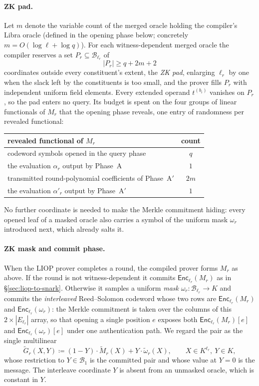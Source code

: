 \documentclass{article}
\theoremstyle{definition}
\newcommand*{\mle}{\widetilde}
\newcommand{\BB}{\mathcal{B}}
\begin{document}
\paragraph{ZK pad.}
Let $m$ denote the variable count of the merged oracle holding the compiler's Libra oracle (defined in the opening phase below; concretely $m = O(\log \boldsymbol{\ell} + \log q)$). For each witness-dependent merged oracle the compiler reserves a set $P_r \subseteq \BB_{\ell_r}$ of
\[
  |P_r| \ge q + 2m + 2
\]
coordinates outside every constituent's extent, the \emph{ZK pad}, enlarging $\ell_r$ by one when the slack left by the constituents is too small, and the prover fills $P_r$ with independent uniform field elements. Every extended operand $t^{(b_i)}$ vanishes on $P_r$, so the pad enters no query. Its budget is spent on the four groups of linear functionals of $M_r$ that the opening phase reveals, one entry of randomness per revealed functional:
\begin{center}
\begin{tabular}{lc}
\hline
revealed functional of $M_r$ & count \\
\hline
codeword symbols opened in the query phase & $q$ \\
the evaluation $\alpha_r$ output by Phase~A & $1$ \\
transmitted round-polynomial coefficients of Phase~A$'$ & $2m$ \\
the evaluation $\alpha'_r$ output by Phase~A$'$ & $1$ \\
\hline
\end{tabular}
\end{center}
No further coordinate is needed to make the Merkle commitment hiding: every opened leaf of a masked oracle also carries a symbol of the uniform mask $\omega_r$ introduced next, which already salts it.

\paragraph{ZK mask and commit phase.}
When the LIOP prover completes a round, the compiled prover forms $M_r$ as above. If the round is not witness-dependent it commits $\textsf{Enc}_{\ell_r}(M_r)$ as in \S\ref{sec:liop-to-snark}. Otherwise it samples a uniform \emph{mask} $\omega_r \colon \BB_{\ell_r} \to K$ and commits the \emph{interleaved} Reed--Solomon codeword whose two rows are $\textsf{Enc}_{\ell_r}(M_r)$ and $\textsf{Enc}_{\ell_r}(\omega_r)$: the Merkle commitment is taken over the columns of this $2 \times |E_{\ell_r}|$ array, so that opening a single position $e$ exposes both $\textsf{Enc}_{\ell_r}(M_r)[e]$ and $\textsf{Enc}_{\ell_r}(\omega_r)[e]$ under one authentication path. We regard the pair as the single multilinear
\[
  \mle{G}_r(X, Y) \coloneqq (1 - Y) \cdot \mle{M}_r(X) + Y \cdot \mle{\omega}_r(X), \qquad X \in K^{\ell_r},\ Y \in K,
\]
whose restriction to $Y \in \BB_1$ is the committed pair and whose value at $Y = 0$ is the message. The interleave coordinate $Y$ is absent from an unmasked oracle, which is constant in $Y$.
\end{document}
